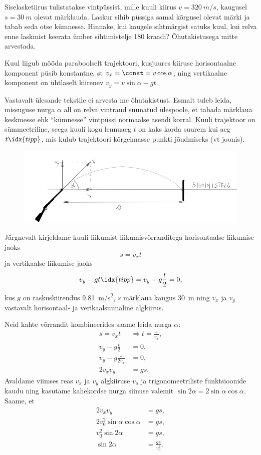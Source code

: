 
Siselasketiirus tulistatakse vintpüssist, mille kuuli kiirus $v=\SI{320}{m/s}$, kaugusel $s=\SI{30}{m}$ olevat märklauda. Laskur sihib püssiga samal kõrgusel olevat märki ja tabab seda otse kümnesse. Hinnake, kui kaugele sihtmärgist satuks kuul, kui relva enne laskmist keerata ümber sihtimistelje 180 kraadi? Õhutakistusega mitte arvestada.

\hint
Kuul liigub mööda paraboolselt trajektoori, kusjuures kiiruse horisontaalne komponent püsib konstantne, st $v_x = \const = v\cos\alpha$, ning vertikaalne komponent on ühtlaselt kiirenev $v_y = v\sin\alpha - gt$.

\solu
Vastavalt ülesande tekstile ei arvesta me õhutakistust.
Esmalt tuleb leida, missuguse nurga $\alpha$ all on relva vintraud suunatud ülespoole, et tabada märklaua keskmesse ehk \enquote{kümnesse} vintpüssi normaalse asendi korral. Kuuli trajektoor on sümmeetriline, seega kuuli kogu lennuaeg $t$ on kaks korda suurem kui aeg $t\idx{tipp}$, mis kulub trajektoori kõrgeimasse punkti jõudmiseks (vt joonis).
\begin{figure}[h!]
	\centering
	\includegraphics[scale=0.55]{2016-v2g-06-Lasketiir-1.PNG}
\end{figure}

Järgnevalt kirjeldame kuuli liikumist liikumisvõrranditega horisontaalse liikumise jaoks
$$
s=v_{x}t
$$
ja vertikaalse liikumise jaoks
$$
v_{y}-gt\idx{tipp}=v_{y}-g\frac{t}{2}=0,
$$
kus $g$ on raskuskiirendus \SI{9,81}{m/s^2}, $s$ märklaua kaugus \SI{30}{m} ning $v_x$ ja $v_y$ vastavalt horisontaal- ja verikaalsuunaline algkiirus.

Neid kahte võrrandit kombineerides saame leida nurga $\alpha$:
\begin{align*}
s=v_{x}t & \Rightarrow t=\frac{s}{v_{x}},\\
v_{y}-g\frac{t}{2} & = 0,\\
v_{y}-g\frac{s}{2v_{x}} & = 0,\\
2v_{x}v_{y} & = gs.
\end{align*}
Avaldame viimses reas $v_x$ ja $v_y$ algkiiruse $v_o$ ja trigonomeetriliste funktsioonide kaudu ning kasutame kahekordse nurga siinuse valemit 
$\sin2\alpha = 2\sin\alpha\cos\alpha$. Saame, et 
\begin{align*}
2v_{x}v_{y} & = gs,\\
2v_{0}^{2}\sin\alpha\cos\alpha & = gs,\\
v_{0}^{2}\sin2\alpha & = gs,\\
\sin2\alpha & = \frac{gs}{v_{0}^{2}}.
\end{align*}

